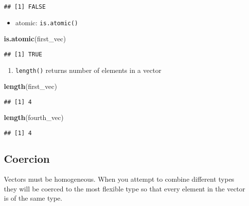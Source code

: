 \documentclass[]{book}
\newenvironment{Shaded}{\begin{snugshade}}{\end{snugshade}}
\newcommand{\KeywordTok}[1]{\textcolor[rgb]{0.13,0.29,0.53}{\textbf{#1}}}
\newcommand{\NormalTok}[1]{#1}
\providecommand{\tightlist}{%
  \setlength{\itemsep}{0pt}\setlength{\parskip}{0pt}}
\begin{document}
\begin{verbatim}
## [1] FALSE
\end{verbatim}

\begin{itemize}
\tightlist
\item
  atomic: \texttt{is.atomic()}
\end{itemize}

\begin{Shaded}
\begin{Highlighting}[]
\KeywordTok{is.atomic}\NormalTok{(first_vec)}
\end{Highlighting}
\end{Shaded}

\begin{verbatim}
## [1] TRUE
\end{verbatim}

\begin{enumerate}
\def\labelenumi{\arabic{enumi}.}
\setcounter{enumi}{2}
\tightlist
\item
  \texttt{length()} returns number of elements in a vector
\end{enumerate}

\begin{Shaded}
\begin{Highlighting}[]
\KeywordTok{length}\NormalTok{(first_vec)}
\end{Highlighting}
\end{Shaded}

\begin{verbatim}
## [1] 4
\end{verbatim}

\begin{Shaded}
\begin{Highlighting}[]
\KeywordTok{length}\NormalTok{(fourth_vec)}
\end{Highlighting}
\end{Shaded}

\begin{verbatim}
## [1] 4
\end{verbatim}

\hypertarget{coercion}{%
\subsection{Coercion}\label{coercion}}

Vectors must be homogeneous. When you attempt to combine different types they will be coerced to the most flexible type so that every element in the vector is of the same type.
\end{document}
